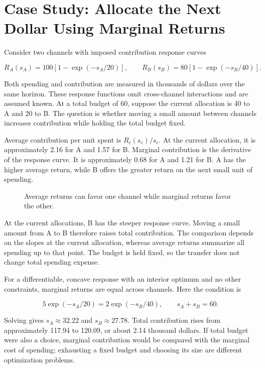 \hypertarget{M08-case-study-allocate-the-next-dollar-using-marginal-returns}{%
\section{Case Study: Allocate the Next Dollar Using Marginal
Returns}\label{M08-case-study-allocate-the-next-dollar-using-marginal-returns}}

\noindent Consider two channels with imposed contribution response curves

\[
R_A(s_A)=100[1-\exp(-s_A/20)],\qquad
R_B(s_B)=80[1-\exp(-s_B/40)].
\]

Both spending and contribution are measured in thousands of dollars over
the same horizon. These response functions omit cross-channel
interactions and are assumed known. At a total budget of 60, suppose the
current allocation is 40 to A and 20 to B. The question is whether
moving a small amount between channels increases contribution while
holding the total budget fixed.

Average contribution per unit spent is \(R_c(s_c)/s_c\). At the current
allocation, it is approximately 2.16 for A and 1.57 for B. Marginal
contribution is the derivative of the response curve. It is
approximately 0.68 for A and 1.21 for B. A has the higher average
return, while B offers the greater return on the next small unit of
spending.

\begin{figure}[htbp]
\centering

\caption{Average returns can favor one channel while marginal returns favor the other.}\label{fig:M08_marginal_returns}
\end{figure}

At the current allocations, B has the steeper response curve. Moving a
small amount from A to B therefore raises total contribution. The
comparison depends on the slopes at the current allocation, whereas
average returns summarize all spending up to that point. The budget is
held fixed, so the transfer does not change total spending expense.

For a differentiable, concave response with an interior optimum and no
other constraints, marginal returns are equal across channels. Here the
condition is

\[
5\exp(-s_A/20)=2\exp(-s_B/40),\qquad s_A+s_B=60.
\]

Solving gives \(s_A\approx32.22\) and \(s_B\approx27.78\). Total
contribution rises from approximately 117.94 to 120.09, or about 2.14
thousand dollars. If total budget were also a choice, marginal
contribution would be compared with the marginal cost of spending;
exhausting a fixed budget and choosing its size are different
optimization problems.

